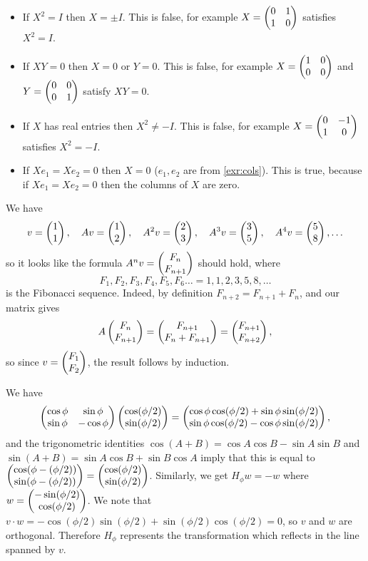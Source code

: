 \documentclass{article}
\begin{document}
\begin{Solution}\label{sol:exr:truefalse}
\begin{itemize}
\item If \(X^2=I\) then \(X=\pm I\). This is false, for example \(X=\begin{pmatrix}
0 & 1 \\ 1 & 0\end{pmatrix}\) satisfies \(X^2=I\).
\item If \(XY=0\) then \(X=0\) or \(Y=0\). This is false, for example
\(X=\begin{pmatrix} 1 & 0 \\ 0 & 0 \end{pmatrix}\) and \(Y=\begin{pmatrix} 0 & 0 \\ 0 & 1\end{pmatrix}\)
satisfy \(XY=0\).
\item If \(X\) has real entries then \(X^2\neq -I\). This is false, for
example \(X=\begin{pmatrix} 0 & -1 \\ 1 & 0 \end{pmatrix}\) satisfies \(X^2=-I\).
\item If \(Xe_1=Xe_2=0\) then \(X=0\) (\(e_1,e_2\) are from
\cref{exr:cols}). This is true, because if \(Xe_1=Xe_2=0\) then
the columns of \(X\) are zero.


\end{itemize}
\end{Solution}
\begin{Solution}\label{sol:exr:fib}
We have \[v=\begin{pmatrix} 1\\ 1\end{pmatrix},\quad Av=\begin{pmatrix} 1\\ 2\end{pmatrix},\quad A^2v=\begin{pmatrix}
2\\ 3\end{pmatrix},\quad A^3v=\begin{pmatrix} 3\\ 5\end{pmatrix},\quad A^4v=\begin{pmatrix} 5\\8\end{pmatrix},\ldots\] so
it looks like the formula \(A^nv=\begin{pmatrix} F_n\\ F_{n+1}\end{pmatrix}\) should hold,
where \[F_1,F_2,F_3,F_4,F_5,F_6\ldots=1,1,2,3,5,8,\ldots\] is the
Fibonacci sequence. Indeed, by definition \(F_{n+2}=F_{n+1}+F_n\),
and our matrix gives \[A\begin{pmatrix} F_n\\ F_{n+1}\end{pmatrix}=\begin{pmatrix}
F_{n+1}\\ F_n+F_{n+1}\end{pmatrix}=\begin{pmatrix} F_{n+1}\\ F_{n+2}\end{pmatrix},\] so since
\(v=\begin{pmatrix} F_1\\ F_2\end{pmatrix}\), the result follows by induction.


\end{Solution}
\begin{Solution}\label{sol:exr:ref}
We have \[\begin{pmatrix} \cos\phi & \sin\phi\\ \sin\phi &
-\cos\phi\end{pmatrix}\begin{pmatrix}\cos(\phi/2)\\ \sin(\phi/2)\end{pmatrix}=\begin{pmatrix}
\cos\phi\cos(\phi/2)+\sin\phi\sin(\phi/2)\\ \sin\phi\cos(\phi/2)-\cos\phi\sin(\phi/2)\end{pmatrix},\]
and the trigonometric identities \(\cos(A+B)=\cos A\cos B-\sin A\sin
B\) and \(\sin(A+B)=\sin A\cos B+\sin B\cos A\) imply that this is
equal to \(\begin{pmatrix} \cos(\phi-(\phi/2))\\\sin(\phi-(\phi/2))\end{pmatrix}=\begin{pmatrix}
\cos(\phi/2)\\ \sin(\phi/2)\end{pmatrix}\). Similarly, we get \(H_\phi w=-w\)
where \(w=\begin{pmatrix} -\sin(\phi/2)\\ \cos(\phi/2)\end{pmatrix}\). We note that
\(v\cdot w=-\cos(\phi/2)\sin(\phi/2)+\sin(\phi/2)\cos(\phi/2)=0\),
so \(v\) and \(w\) are orthogonal. Therefore \(H_\phi\) represents
the transformation which reflects in the line spanned by \(v\).


\end{Solution}
\end{document}
